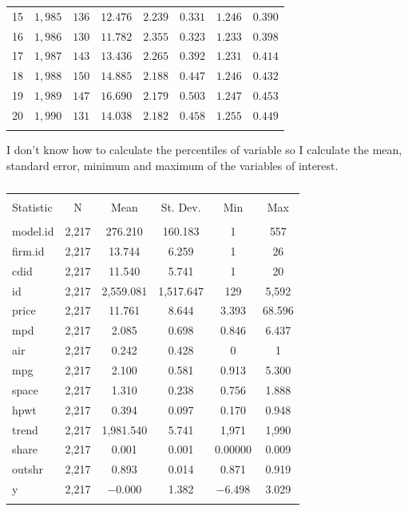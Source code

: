 \documentclass[12pt]{article}
\begin{document}
\begin{table}[!htbp]
\begin{tabular}{@{\extracolsep{5pt}} cccccccc}
15 & $1,985$ & $136$ & $12.476$ & $2.239$ & $0.331$ & $1.246$ & $0.390$ \\ 
16 & $1,986$ & $130$ & $11.782$ & $2.355$ & $0.323$ & $1.233$ & $0.398$ \\ 
17 & $1,987$ & $143$ & $13.436$ & $2.265$ & $0.392$ & $1.231$ & $0.414$ \\ 
18 & $1,988$ & $150$ & $14.885$ & $2.188$ & $0.447$ & $1.246$ & $0.432$ \\ 
19 & $1,989$ & $147$ & $16.690$ & $2.179$ & $0.503$ & $1.247$ & $0.453$ \\ 
20 & $1,990$ & $131$ & $14.038$ & $2.182$ & $0.458$ & $1.255$ & $0.449$ \\ 
\hline \\[-1.8ex] 
\end{tabular} 
\end{table} 

\newpage
\noindent I don't know how to calculate the percentiles of variable so I calculate the mean, standard error, minimum and maximum of the variables of interest. 
\begin{table}[!htbp] \centering 
  \caption{} 
  \label{} 
\begin{tabular}{@{\extracolsep{5pt}}lccccc} 
\\[-1.8ex]\hline 
\hline \\[-1.8ex] 
Statistic & \multicolumn{1}{c}{N} & \multicolumn{1}{c}{Mean} & \multicolumn{1}{c}{St. Dev.} & \multicolumn{1}{c}{Min} & \multicolumn{1}{c}{Max} \\ 
\hline \\[-1.8ex] 
model.id & 2,217 & 276.210 & 160.183 & 1 & 557 \\ 
firm.id & 2,217 & 13.744 & 6.259 & 1 & 26 \\ 
cdid & 2,217 & 11.540 & 5.741 & 1 & 20 \\ 
id & 2,217 & 2,559.081 & 1,517.647 & 129 & 5,592 \\ 
price & 2,217 & 11.761 & 8.644 & 3.393 & 68.596 \\ 
mpd & 2,217 & 2.085 & 0.698 & 0.846 & 6.437 \\ 
air & 2,217 & 0.242 & 0.428 & 0 & 1 \\ 
mpg & 2,217 & 2.100 & 0.581 & 0.913 & 5.300 \\ 
space & 2,217 & 1.310 & 0.238 & 0.756 & 1.888 \\ 
hpwt & 2,217 & 0.394 & 0.097 & 0.170 & 0.948 \\ 
trend & 2,217 & 1,981.540 & 5.741 & 1,971 & 1,990 \\ 
share & 2,217 & 0.001 & 0.001 & 0.00000 & 0.009 \\ 
outshr & 2,217 & 0.893 & 0.014 & 0.871 & 0.919 \\ 
y & 2,217 & $-$0.000 & 1.382 & $-$6.498 & 3.029 \\ 
\hline \\[-1.8ex] 
\end{tabular} 
\end{table} 
\\\\
\end{document}
